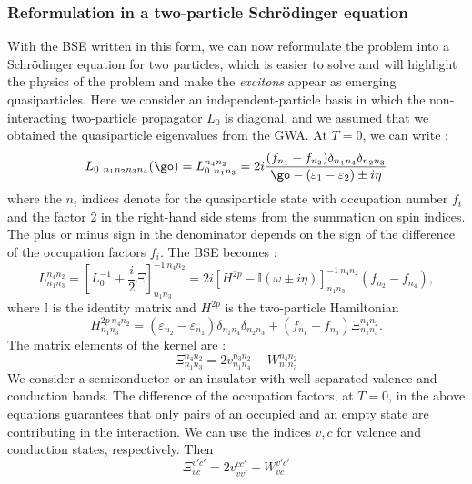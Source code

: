 \subsubsection{Reformulation in a two-particle Schrödinger equation}
With the \gls{BSE} written in this form, we can now reformulate the problem into a Schrödinger equation for two particles, which is easier to solve and will highlight the physics of the problem and make the \textit{excitons} appear as emerging quasiparticles. Here we consider an independent-particle basis in which the non-interacting two-particle propagator $L_0$ is diagonal, and we assumed that we obtained the quasiparticle eigenvalues from the \gls{GWA}. At $T=0$, we can write :
\begin{equation}
	L_{0\ n_1n_2n_3n_4}(\go) = L_{0\ n_1n_3}^{n_4n_2} = 2 i \frac{(f_{n_1} - f_{n_2}) \delta_{n_1n_4}\delta_{n_2n_3}}{\go - (\varepsilon_1 - \varepsilon_2) \pm i\eta}
\end{equation}
where the $n_i$ indices denote for the quasiparticle state with occupation number $f_i$ and the factor 2 in the right-hand side stems from the summation on spin indices. The plus or minus sign in the denominator depends on the sign of the difference of the occupation factors $f_i$. The \gls{BSE} becomes :
\begin{equation}
	L_{n_1n_3}^{n_4n_2} = \left[ L_0^{-1} + \frac{i}{2}\Xi\right]^{-1\ n_4n_2}_{n_1n_3} = 2i \left[ H^{2p} - \mathbb{I}(\omega \pm i\eta) \right]^{-1\ n_4n_2}_{n_1n_3}(f_{n_2} - f_{n_4}),
\end{equation}
where $\mathbb{I}$ is the identity matrix and $H^{2p}$ is the two-particle Hamiltonian 
\begin{equation}
	H^{2p\ n_4n_2}_{n_1n_3} = (\varepsilon_{n_2} - \varepsilon_{n_1}) \delta_{n_1n_4}\delta_{n_2n_3} + (f_{n_1} - f_{n_3}) \Xi_{n_1n_3}^{n_4n_2}. \label{eq:BSE_H2p}
\end{equation}
The matrix elements of the kernel are :
\begin{equation}
	\Xi_{n_1n_3}^{n_4n_2} = 2v_{n_1n_4}^{n_3n_2} - W_{n_1n_3}^{n_4n_2} \label{eq:GW-BSE_kernel}
\end{equation}
We consider a semiconductor or an insulator with well-separated valence and conduction bands. The difference of the occupation factors, at $T=0$, in the above equations guarantees that only pairs of an occupied and an empty state are contributing in the interaction. We can use the indices $v,c$ for valence and conduction states, respectively. Then
\begin{equation}
	\Xi^{v'c'}_{vc} = 2v^{cc'}_{vv'} - W^{v'c'}_{vc}
\end{equation}
